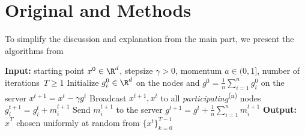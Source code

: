 \documentclass{article}
\begin{document}



\section{Original  and  Methods}
To simplify the discussion and explanation from the main part, we present the algorithms from \citep{tyurin2022dasha}

\begin{algorithm*}
  \caption{}
  \label{alg:main_algorithm_dasha}
  \begin{algorithmic}[1]
  \STATE \textbf{Input:} starting point $x^0 \in \R^d$, stepsize $\gamma > 0$, momentum $a \in (0, 1]$, 
  number of iterations~$T \geq 1$
  \STATE Initialize $g^0_i\in \R^d$ on the nodes and  $g^0 = \frac{1}{n}\sum_{i=1}^n g^0_i$ on the server
  \STATE $x^{t+1} = x^t - \gamma g^t$
  \STATE Broadcast $x^{t+1}, x^{t}$ to all \textit{participating}\textsuperscript{\red (a)} nodes
  \STATE $g^{t+1}_i = g^{t}_i + m^{t+1}_i$
  \STATE Send $m^{t+1}_i$ to the server
  \ENDFOR
  \STATE $g^{t+1} = g^t + \frac{1}{n} \sum_{i=1}^n m^{t+1}_i$
  \ENDFOR
  \STATE \textbf{Output:} $\hat{x}^T$ chosen uniformly at random from $\{x^t\}_{k=0}^{T-1}$ 
  \end{algorithmic}
\end{algorithm*}
\end{document}
